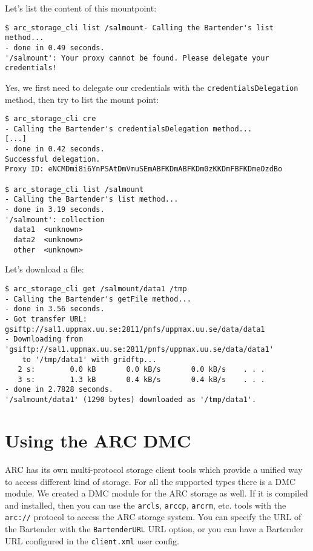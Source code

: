 \documentclass{book}
\begin{document}
Let's list the content of this mountpoint:

\begin{verbatim}
$ arc_storage_cli list /salmount- Calling the Bartender's list method...
- done in 0.49 seconds.
'/salmount': Your proxy cannot be found. Please delegate your credentials!
\end{verbatim}

Yes, we first need to delegate our credentials with the \verb!credentialsDelegation! method, then try to list the mount point:

\begin{verbatim}
$ arc_storage_cli cre
- Calling the Bartender's credentialsDelegation method...
[...]
- done in 0.42 seconds.
Successful delegation.
Proxy ID: eNCMDmi8i6YnPSAtDmVmuSEmABFKDmABFKDm0zKKDmFBFKDmeOzdBo

$ arc_storage_cli list /salmount
- Calling the Bartender's list method...
- done in 3.19 seconds.
'/salmount': collection
  data1  <unknown>
  data2  <unknown>
  other  <unknown>
\end{verbatim}

Let's download a file:

\begin{verbatim}
$ arc_storage_cli get /salmount/data1 /tmp
- Calling the Bartender's getFile method...
- done in 3.56 seconds.
- Got transfer URL: gsiftp://sal1.uppmax.uu.se:2811/pnfs/uppmax.uu.se/data/data1
- Downloading from 'gsiftp://sal1.uppmax.uu.se:2811/pnfs/uppmax.uu.se/data/data1'
    to '/tmp/data1' with gridftp...
   2 s:        0.0 kB       0.0 kB/s       0.0 kB/s    . . .       
   3 s:        1.3 kB       0.4 kB/s       0.4 kB/s    . . .       
- done in 2.7828 seconds.
'/salmount/data1' (1290 bytes) downloaded as '/tmp/data1'.
\end{verbatim}

\section{Using the ARC DMC} %
\label{sec:using_the_arc_dmc}

ARC has its own multi-protocol storage client tools which provide a unified way to access different kind of storage. For all the supported types there is a DMC module. We created a DMC module for the ARC storage as well. If it is compiled and installed, then you can use the \verb!arcls!, \verb!arccp!, \verb!arcrm!, etc. tools with the \verb!arc://! protocol to access the ARC storage system. You can specify the URL of the Bartender with the \verb!BartenderURL! URL option, or you can have a Bartender URL configured in the \verb!client.xml! user config.
\end{document}
